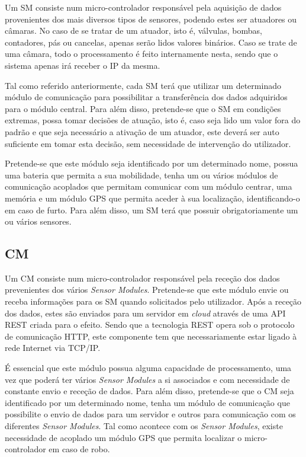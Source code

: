 Um \acl{SM} consiste num micro-controlador responsável pela aquisição de dados provenientes dos mais diversos tipos de sensores, podendo estes ser atuadores ou câmaras. No caso de se tratar de um atuador, isto é, válvulas, bombas, contadores, pás ou cancelas, apenas serão lidos valores binários. Caso se trate de uma câmara, todo o processamento é feito internamente nesta, sendo que o sistema apenas irá receber o IP da mesma. 


Tal como referido anteriormente, cada \acl{SM} terá que utilizar um determinado módulo de comunicação para possibilitar a transferência dos dados adquiridos para o módulo central. Para além disso, pretende-se que o \acl{SM} em condições extremas, possa tomar decisões de atuação, isto é, caso seja lido um valor fora do padrão e que seja necessário a ativação de um atuador, este deverá ser auto suficiente em tomar esta decisão, sem necessidade de intervenção do utilizador. 

Pretende-se que este módulo seja identificado por um determinado nome, possua uma bateria que permita a sua mobilidade, tenha um ou vários módulos de comunicação acoplados que permitam comunicar com um módulo centrar, uma memória e um módulo \ac{GPS} que permita aceder à sua localização, identificando-o em caso de furto. Para além disso, um \acl{SM} terá que possuir obrigatoriamente um ou vários sensores.








\subsection{\acl{CM}}



Um \acl{CM} consiste num micro-controlador responsável pela receção dos dados prevenientes dos vários \textit{Sensor Modules}. Pretende-se que este módulo envie ou receba informações para os \acl{SM} quando solicitados pelo utilizador. Após a receção dos dados, estes são enviados para um servidor em \textit{cloud} através de uma \ac{API} \ac{REST} criada para o efeito. Sendo que a tecnologia \ac{REST} opera sob o protocolo de comunicação \ac{HTTP}, este componente tem que necessariamente estar ligado à rede Internet via \ac{TCP}/\ac{IP}. 

É essencial que este módulo possua alguma capacidade de processamento, uma vez que poderá ter vários \textit{Sensor Modules} a si associados e com necessidade de constante envio e receção de dados.  Para além disso, pretende-se que o \acl{CM} seja identificado por um determinado nome, tenha um  módulo de comunicação que possibilite o envio de dados para um servidor e outros para comunicação com os diferentes \textit{Sensor Modules}. Tal como acontece com os \textit{Sensor Modules}, existe necessidade de acoplado um módulo \ac{GPS} que permita localizar o micro-controlador em caso de robo.
 






